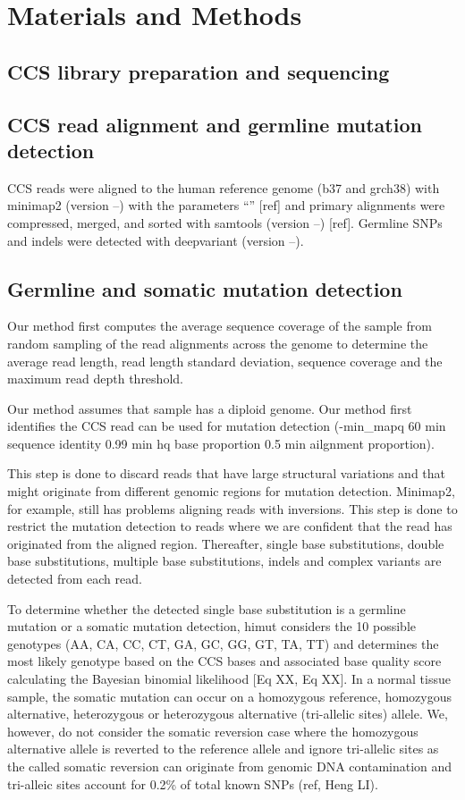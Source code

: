 \section{Materials and Methods}

\subsection{CCS library preparation and sequencing}

\subsection{CCS read alignment and germline mutation detection}
CCS reads were aligned to the human reference genome (b37 and grch38) with minimap2 (version --) with the parameters “” [ref] and primary alignments were compressed, merged, and sorted with samtools (version --) [ref]. Germline SNPs and indels were detected with deepvariant (version --).

\subsection{Germline and somatic mutation detection}

Our method first computes the average sequence coverage of the sample from random sampling of the read alignments across the genome to determine the average read length, read length standard deviation, sequence coverage and the maximum read depth threshold. 

Our method assumes that sample has a diploid genome. Our method first identifies the CCS read can be used for mutation detection (-min\_mapq 60 min sequence identity 0.99 min hq base proportion 0.5 min ailgnment proportion). 

This step is done to discard reads that have large structural variations and that might originate from different genomic regions for mutation detection. Minimap2, for example, still has problems aligning reads with inversions. This step is done to restrict the mutation detection to reads where we are confident that the read has originated from the aligned region. Thereafter, single base substitutions, double base substitutions, multiple base substitutions, indels and complex variants are detected from each read. 

To determine whether the detected single base substitution is a germline mutation or a somatic mutation detection, himut considers the 10 possible genotypes (AA, CA, CC, CT, GA, GC, GG, GT, TA, TT) and determines the most likely genotype based on the CCS bases and associated base quality score calculating the Bayesian binomial likelihood [Eq XX, Eq XX]. In a normal tissue sample, the somatic mutation can occur on a homozygous reference, homozygous alternative, heterozygous or heterozygous alternative (tri-allelic sites) allele. We, however, do not consider the somatic reversion case where the homozygous alternative allele is reverted to the reference allele and ignore tri-allelic sites as the called somatic reversion can originate from genomic DNA contamination and tri-alleic sites account for 0.2\% of total known SNPs (ref, Heng LI). 

